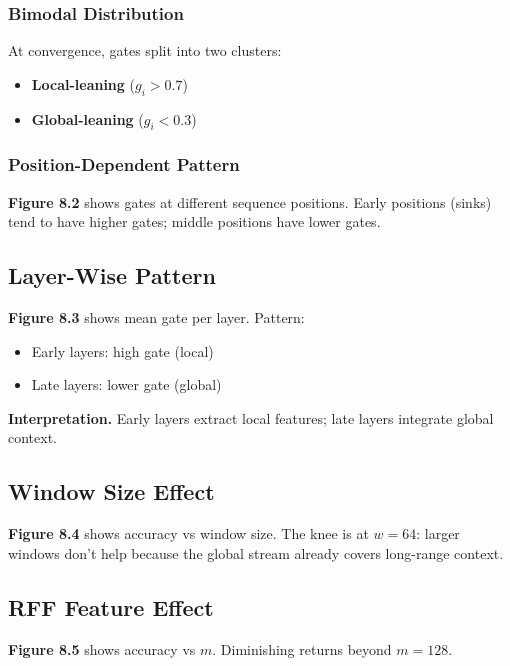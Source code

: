 \subsubsection{Bimodal Distribution}

At convergence, gates split into two clusters:
\begin{itemize}
\item \textbf{Local-leaning} ($g_i > 0.7$)
\item \textbf{Global-leaning} ($g_i < 0.3$)

\end{itemize}
\subsubsection{Position-Dependent Pattern}

\textbf{Figure 8.2} shows gates at different sequence positions. Early positions 
(sinks) tend to have higher gates; middle positions have lower gates.

\subsection{Layer-Wise Pattern}

\textbf{Figure 8.3} shows mean gate per layer. Pattern:

\begin{itemize}
\item Early layers: high gate (local)
\item Late layers: lower gate (global)

\end{itemize}
\textbf{Interpretation.} Early layers extract local features; late layers 
integrate global context.

\subsection{Window Size Effect}

\textbf{Figure 8.4} shows accuracy vs window size. The knee is at $w = 64$: larger 
windows don't help because the global stream already covers long-range 
context.

\subsection{RFF Feature Effect}

\textbf{Figure 8.5} shows accuracy vs $m$. Diminishing returns beyond $m = 128$.

